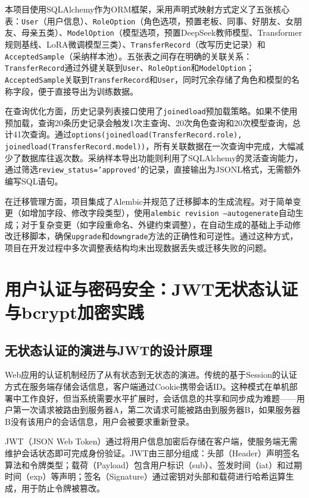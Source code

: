 \documentclass[12pt,a4paper]{ctexart}
\begin{document}
本项目使用SQLAlchemy作为ORM框架，采用声明式映射方式定义了五张核心表：\texttt{User}（用户信息）、\texttt{RoleOption}（角色选项，预置老板、同事、好朋友、女朋友、母亲五类）、\texttt{ModelOption}（模型选项，预置DeepSeek教师模型、Transformer规则基线、LoRA微调模型三类）、\texttt{TransferRecord}（改写历史记录）和\texttt{AcceptedSample}（采纳样本池）。五张表之间存在明确的关联关系：\texttt{TransferRecord}通过外键关联到\texttt{User}、\texttt{RoleOption}和\texttt{ModelOption}；\texttt{AcceptedSample}关联到\texttt{TransferRecord}和\texttt{User}，同时冗余存储了角色和模型的名称字段，便于直接导出为训练数据。

在查询优化方面，历史记录列表接口使用了\texttt{joinedload}预加载策略。如果不使用预加载，查询20条历史记录会触发1次主查询、20次角色查询和20次模型查询，总计41次查询。通过\texttt{options(joinedload(TransferRecord.role), joinedload(TransferRecord.model))}，所有关联数据在一次查询中完成，大幅减少了数据库往返次数。采纳样本导出功能则利用了SQLAlchemy的灵活查询能力，通过筛选\texttt{review\_status='approved'}的记录，直接输出为JSONL格式，无需额外编写SQL语句。

在迁移管理方面，项目集成了Alembic并规范了迁移脚本的生成流程。对于简单变更（如增加字段、修改字段类型），使用\texttt{alembic revision --autogenerate}自动生成；对于复杂变更（如字段重命名、外键约束调整），在自动生成的基础上手动修改迁移脚本，确保\texttt{upgrade}和\texttt{downgrade}方法的正确性和可逆性。通过这种方式，项目在开发过程中多次调整表结构均未出现数据丢失或迁移失败的问题。

\section{用户认证与密码安全：JWT无状态认证与bcrypt加密实践}

\subsection{无状态认证的演进与JWT的设计原理}

Web应用的认证机制经历了从有状态到无状态的演进。传统的基于Session的认证方式在服务端存储会话信息，客户端通过Cookie携带会话ID。这种模式在单机部署中工作良好，但当系统需要水平扩展时，会话信息的共享和同步成为难题——用户第一次请求被路由到服务器A，第二次请求可能被路由到服务器B，如果服务器B没有该用户的会话信息，用户会被要求重新登录。

JWT（JSON Web Token）通过将用户信息加密后存储在客户端，使服务端无需维护会话状态即可完成身份验证。JWT由三部分组成：头部（Header）声明签名算法和令牌类型；载荷（Payload）包含用户标识（sub）、签发时间（iat）和过期时间（exp）等声明；签名（Signature）通过密钥对头部和载荷进行哈希运算生成，用于防止令牌被篡改。
\end{document}
